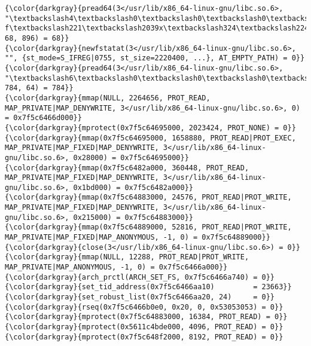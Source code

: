 {{\begin{Verbatim}[commandchars=\\\{\}]
{\color{darkgray}{pread64(3</usr/lib/x86_64-linux-gnu/libc.so.6>, "\textbackslash4\textbackslash0\textbackslash0\textbackslash0\textbackslash24\textbackslash0\textbackslash0\textbackslash0\textbackslash3\textbackslash0\textbackslash0\textbackslash0GNU\textbackslash0I\textbackslash17\textbackslash357\textbackslash204\textbackslash3$\textbackslash f\textbackslash221\textbackslash2039x\textbackslash324\textbackslash224\textbackslash323\textbackslash236S"..., 68, 896) = 68}}
{\color{darkgray}{newfstatat(3</usr/lib/x86_64-linux-gnu/libc.so.6>, "", {st_mode=S_IFREG|0755, st_size=2220400, ...}, AT_EMPTY_PATH) = 0}}
{\color{darkgray}{pread64(3</usr/lib/x86_64-linux-gnu/libc.so.6>, "\textbackslash6\textbackslash0\textbackslash0\textbackslash0\textbackslash4\textbackslash0\textbackslash0\textbackslash0@\textbackslash0\textbackslash0\textbackslash0\textbackslash0\textbackslash0\textbackslash0\textbackslash0@\textbackslash0\textbackslash0\textbackslash0\textbackslash0\textbackslash0\textbackslash0\textbackslash0@\textbackslash0\textbackslash0\textbackslash0\textbackslash0\textbackslash0\textbackslash0\textbackslash0"..., 784, 64) = 784}}
{\color{darkgray}{mmap(NULL, 2264656, PROT_READ, MAP_PRIVATE|MAP_DENYWRITE, 3</usr/lib/x86_64-linux-gnu/libc.so.6>, 0) = 0x7f5c6466d000}}
{\color{darkgray}{mprotect(0x7f5c64695000, 2023424, PROT_NONE) = 0}}
{\color{darkgray}{mmap(0x7f5c64695000, 1658880, PROT_READ|PROT_EXEC, MAP_PRIVATE|MAP_FIXED|MAP_DENYWRITE, 3</usr/lib/x86_64-linux-gnu/libc.so.6>, 0x28000) = 0x7f5c64695000}}
{\color{darkgray}{mmap(0x7f5c6482a000, 360448, PROT_READ, MAP_PRIVATE|MAP_FIXED|MAP_DENYWRITE, 3</usr/lib/x86_64-linux-gnu/libc.so.6>, 0x1bd000) = 0x7f5c6482a000}}
{\color{darkgray}{mmap(0x7f5c64883000, 24576, PROT_READ|PROT_WRITE, MAP_PRIVATE|MAP_FIXED|MAP_DENYWRITE, 3</usr/lib/x86_64-linux-gnu/libc.so.6>, 0x215000) = 0x7f5c64883000}}
{\color{darkgray}{mmap(0x7f5c64889000, 52816, PROT_READ|PROT_WRITE, MAP_PRIVATE|MAP_FIXED|MAP_ANONYMOUS, -1, 0) = 0x7f5c64889000}}
{\color{darkgray}{close(3</usr/lib/x86_64-linux-gnu/libc.so.6>) = 0}}
{\color{darkgray}{mmap(NULL, 12288, PROT_READ|PROT_WRITE, MAP_PRIVATE|MAP_ANONYMOUS, -1, 0) = 0x7f5c6466a000}}
{\color{darkgray}{arch_prctl(ARCH_SET_FS, 0x7f5c6466a740) = 0}}
{\color{darkgray}{set_tid_address(0x7f5c6466aa10)         = 23663}}
{\color{darkgray}{set_robust_list(0x7f5c6466aa20, 24)     = 0}}
{\color{darkgray}{rseq(0x7f5c6466b0e0, 0x20, 0, 0x53053053) = 0}}
{\color{darkgray}{mprotect(0x7f5c64883000, 16384, PROT_READ) = 0}}
{\color{darkgray}{mprotect(0x5611c4bde000, 4096, PROT_READ) = 0}}
{\color{darkgray}{mprotect(0x7f5c648f2000, 8192, PROT_READ) = 0}}

\end{Verbatim}}}
